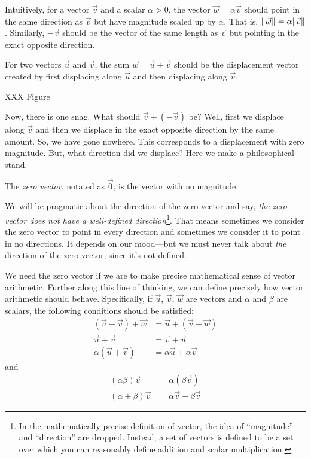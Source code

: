 Intuitively, for a vector $\vec v$ and a scalar $\alpha>0$, the
vector $\vec w=\alpha\vec v$ should point in the same direction as
$\vec v$ but have magnitude scaled up by $\alpha$.  That is, $\lVert\vec w\rVert=\alpha\lVert\vec v\rVert$.
Similarly, $-\vec v$ should be the vector of the same length as $\vec v$ but
pointing in the exact opposite direction.

For two vectors $\vec u$ and $\vec v$, the sum $\vec w=\vec u+\vec v$
should be the displacement vector created by first displacing along $\vec u$
and then displacing along $\vec v$.

XXX Figure

Now, there is one snag.  What should $\vec v+(-\vec v)$ be?  Well, first we
displace along $\vec v$ and then we displace in the exact opposite direction 
by the same amount.  So, we have gone nowhere.  This corresponds to a displacement
with zero magnitude.  But, what direction did we displace?  Here we make a philosophical
stand.
\begin{definition}
	The \emph{zero vector}, notated as $\vec 0$, 
	is the vector with no magnitude.
\end{definition}
We will be pragmatic about the direction of the zero vector and say,
\emph{the zero vector does not have a well-defined direction}\footnote{
	In the mathematically precise definition of vector, the idea of ``magnitude''
	and ``direction'' are dropped.  Instead, a set of vectors is defined to be
	a set over which you can reasonably define addition and scalar multiplication.
}.  That means
sometimes we consider the zero vector to point in every direction and sometimes
we consider it to point in no directions.  It depends on our mood---but we must
never talk about \emph{the} direction of the zero vector, since it's not defined.

We need the zero vector if we are to make precise mathematical
sense of vector arithmetic.
Further along this line of thinking, we can define precisely how vector arithmetic
should behave.  Specifically, if $\vec u$, $\vec v$, $\vec w$ are vectors and $\alpha$ and $\beta$
are scalars, the
following conditions should be satisfied:
\begin{align*}
	(\vec u+\vec v)+\vec w&=\vec u+(\vec v+\vec w)\tag{Associativity}\\
	\vec u+\vec v&=\vec v+\vec u\tag{Commutativity}\\
	\alpha(\vec u+\vec v)&=\alpha\vec u+\alpha \vec v\tag{Distributivity}
\end{align*}
and 
\begin{align*}
	(\alpha\beta)\vec v&=\alpha(\beta \vec v)\tag{Associativity II}\\
	(\alpha+\beta)\vec v&=\alpha\vec v+\beta \vec v\tag{Distributivity II}
\end{align*}

